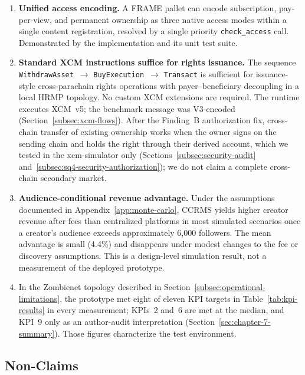 \begin{enumerate}

\item \textbf{Unified access encoding.} A FRAME pallet can encode subscription, pay-per-view, and permanent ownership as three native access modes within a single content registration, resolved by a single priority \texttt{check\_access} call. Demonstrated by the implementation and its unit test suite.

\item \textbf{Standard XCM instructions suffice for rights issuance.} The sequence \texttt{WithdrawAsset}~$\to$ \texttt{BuyExecution}~$\to$ \texttt{Transact} is sufficient for issuance-style cross-parachain rights operations with payer--beneficiary decoupling in a local HRMP topology. No custom XCM extensions are required. The runtime executes XCM~v5; the benchmark message was V3-encoded (Section~\ref{subsec:xcm-flows}). After the Finding~B authorization fix, cross-chain transfer of existing ownership works when the owner signs on the sending chain and holds the right through their derived account, which we tested in the xcm-simulator only (Sections~\ref{subsec:security-audit} and~\ref{subsec:sq4-security-authorization}); we do not claim a complete cross-chain secondary market.

\item \textbf{Audience-conditional revenue advantage.} Under the assumptions documented in Appendix~\ref{app:monte-carlo}, CCRMS yields higher creator revenue after fees than centralized platforms in most simulated scenarios once a creator's audience exceeds approximately 6,000 followers. The mean advantage is small (4.4\%) and disappears under modest changes to the fee or discovery assumptions. This is a design-level simulation result, not a measurement of the deployed prototype.

\item In the Zombienet topology described in Section~\ref{subsec:operational-limitations}, the prototype met eight of eleven KPI targets in Table~\ref{tab:kpi-results} in every measurement; KPIs~2 and~6 are met at the median, and KPI~9 only as an author-audit interpretation (Section~\ref{sec:chapter-7-summary}). Those figures characterize the test environment.

\end{enumerate}

\subsection{Non-Claims}\label{subsec:non-claims}

